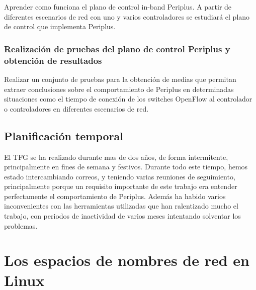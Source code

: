 \documentclass[a4paper, 12pt]{book}
\begin{document}
	Aprender como funciona el plano de control in-band Periplus. A partir de diferentes escenarios de red con uno y varios controladores se estudiará
	el plano de control que implementa Periplus.
	
	\subsection{Realización de pruebas del plano de control Periplus y obtención de resultados}
	\label{sec:objetivos-analisis-periplus}
	
	Realizar un conjunto de pruebas para la obtención de medias que permitan extraer conclusiones
	sobre el comportamiento de Periplus	en determinadas	situaciones como el tiempo de conexión de los switches OpenFlow al controlador o controladores en diferentes escenarios de red.
	
	
	\section{Planificación temporal}
	\label{sec:planificacion-temporal}
	
	El TFG se ha realizado durante mas de dos años, de forma intermitente, principalmente en fines de semana y festivos. Durante todo este tiempo, hemos estado intercambiando correos, y teniendo varias reuniones de seguimiento, principalmente porque un requisito importante de este trabajo era entender perfectamente el comportamiento de Periplus.
	Además ha habido varios inconvenientes con las herramientas utilizadas que han ralentizado mucho el trabajo, con periodos de inactividad de varios meses intentando solventar los problemas.
	
	
	
	\cleardoublepage
		
	
	\cleardoublepage %
	\chapter{Los espacios de nombres de red en Linux  } %
	\label{chap:mininet} %
	
\end{document}

